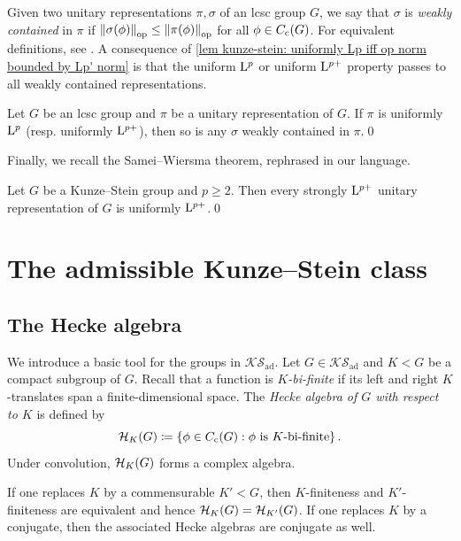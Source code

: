 \documentclass[a4paper, 10pt]{article}
\newcommand{\aks}{\mathcal{KS}_{\mathrm{ad}}}
\begin{document}
    Given two unitary representations $\pi, \sigma$ of an lcsc group $G$, we say that $\sigma$ is \emph{weakly contained} in $\pi$ if $\left\| \sigma(\phi) \right\|_{\mathrm{op}} \leq \left\| \pi(\phi) \right\|_{\mathrm{op}}$ for all $\phi\in C_{\mathrm{c}}(G)$. For equivalent definitions, see \cite[\S 1.C]{bekka-harpe2020unitary}.
    A consequence of \autoref{lem kunze-stein: uniformly Lp iff op norm bounded by Lp' norm} is that the uniform $\mathrm{L}^p$ or uniform $\mathrm{L}^{p+}$ property passes to all weakly contained representations.
    \begin{lemma}\label{lem: uniformly Lp passes to weakly contained}
        Let $G$ be an lcsc group and $\pi$ be a unitary representation of $G$. 
        If $\pi$ is uniformly $\mathrm{L}^{p}$ (resp. uniformly $\mathrm{L}^{p+}$), then so is any $\sigma$ weakly contained in $\pi$.\qed
    \end{lemma}

    Finally, we recall the Samei--Wiersma theorem, rephrased in our language.
    \begin{theorem}\label{thm samei-wiersma: almost Lp implies uniformly Lp, kunze-stein unimodular}
        Let $G$ be a Kunze--Stein group and $p\geq 2$. Then every strongly $\mathrm{L}^{p+}$ unitary representation of $G$ is uniformly $\mathrm{L}^{p+}$.\qed
    \end{theorem}


\section{The admissible Kunze--Stein class}\label{sec: ad KS class}
\subsection{The Hecke algebra}
We introduce a basic tool for the groups in $\aks$.
Let $G\in\aks$ and $K<G$ be a compact subgroup of $G$. Recall that a function is \emph{$K$-bi-finite} if its left and right $K$-translates span a finite-dimensional space.
The \emph{Hecke algebra of $G$ with respect to $K$} is defined by
\begin{equation}\label{eq def: H_K, ss Lie}
    \mathcal{H}_K(G) \coloneq \left\{ \phi\in C_{\mathrm{c}}(G) : \textup{$\phi$ is $K$-bi-finite} \right\}.
\end{equation}
Under convolution, $\mathcal{H}_K(G)$ forms a complex algebra.

If one replaces $K$ by a commensurable $K'<G$, then $K$-finiteness and $K'$-finiteness are equivalent and hence $\mathcal{H}_K(G)=\mathcal{H}_{K'}(G)$. If one replaces $K$ by a conjugate, then the associated Hecke algebras are conjugate as well.
\end{document}

